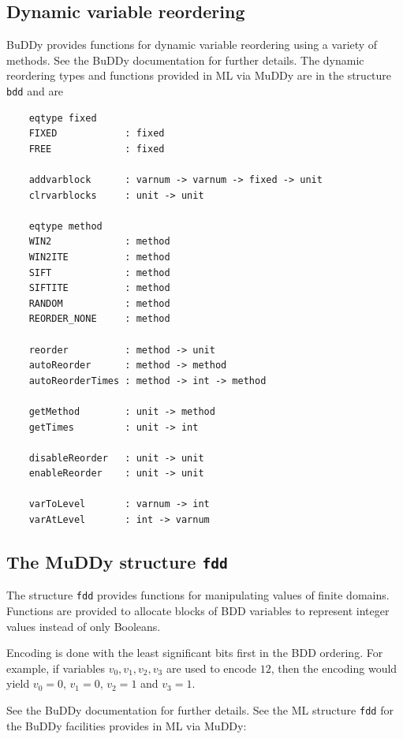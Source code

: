 \documentclass[12pt,fleqn]{article}
\renewcommand{\t}[1]{\mbox{\tt #1}}
\newcommand{\Buddy}{BuDDy{}}
\newcommand{\Muddy}{MuDDy{}}
\begin{document}
\subsection{Dynamic variable reordering}

\Buddy{} provides functions for dynamic variable reordering using a variety of methods.
See the \Buddy{} documentation \cite{BuDDy} for further details. The dynamic reordering
types and functions provided in ML via \Muddy{} are in the structure \t{bdd} and are

\begin{verbatim}
    eqtype fixed
    FIXED            : fixed
    FREE             : fixed

    addvarblock      : varnum -> varnum -> fixed -> unit
    clrvarblocks     : unit -> unit

    eqtype method
    WIN2             : method
    WIN2ITE          : method
    SIFT             : method
    SIFTITE          : method
    RANDOM           : method
    REORDER_NONE     : method

    reorder          : method -> unit
    autoReorder      : method -> method
    autoReorderTimes : method -> int -> method

    getMethod        : unit -> method
    getTimes         : unit -> int

    disableReorder   : unit -> unit
    enableReorder    : unit -> unit

    varToLevel       : varnum -> int
    varAtLevel       : int -> varnum
\end{verbatim}

\subsection{The \Muddy{} structure \t{fdd}}\label{fdd}

The structure \t{fdd} provides functions for manipulating values of finite domains.
Functions are provided to allocate blocks of BDD variables to represent integer values instead
of only Booleans.

Encoding is done with the least significant bits first in the BDD ordering. For example, if variables
$v_0, v_1, v_2, v_3$ are used to encode $12$, then the encoding would yield
$v_0=0$, $v_1=0$, $v_2=1$ and $v_3=1$.

See the \Buddy{} documentation \cite{BuDDy} for further details. See the ML structure \t{fdd}
for the \Buddy{} facilities provides in ML via \Muddy:
\end{document}
